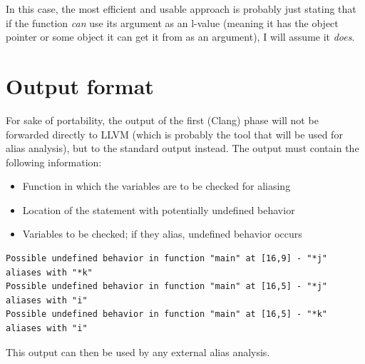 In this case, the most efficient and usable approach is probably just stating that if the function \emph{can} use its argument as an l-value (meaning it has the object pointer or some object it can get it from as an argument), I will assume it \emph{does}.

\section{Output format}
For sake of portability, the output of the first (Clang) phase will not be forwarded directly to LLVM (which is probably the tool that will be used for alias analysis), but to the standard output instead. The output must contain the following information:

\begin{itemize}
\item Function in which the variables are to be checked for aliasing
\item Location of the statement with potentially undefined behavior
\item Variables to be checked; if they alias, undefined behavior occurs
\end{itemize}

\begin{lstlisting}
Possible undefined behavior in function "main" at [16,9] - "*j" aliases with "*k"
Possible undefined behavior in function "main" at [16,5] - "*j" aliases with "i"
Possible undefined behavior in function "main" at [16,5] - "*k" aliases with "i"
\end{lstlisting}

This output can then be used by any external alias analysis.

